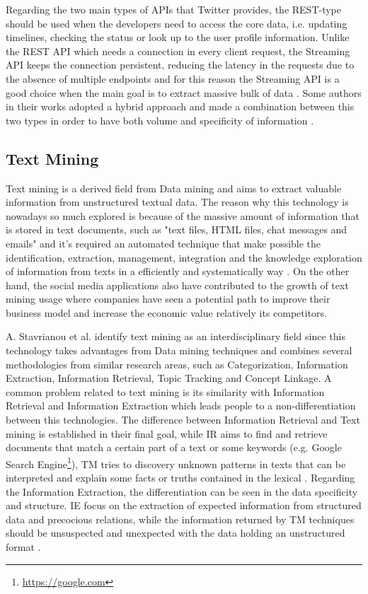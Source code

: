 Regarding the two main types of APIs that Twitter provides, the REST-type should be used when the developers need to access the core data, i.e. updating timelines, checking the status or look up to the user profile information. Unlike the REST API which needs a connection in every client request, the Streaming API keeps the connection persistent, reducing the latency in the requests due to the absence of multiple endpoints and for this reason the Streaming API is a good choice when the main goal is to extract massive bulk of data \cite{kn:Sriram2010}. Some authors in their works adopted a hybrid approach and made a combination between this two types in order to have both volume and specificity of information \cite{kn:Musto2015,kn:Abel2012}.

\subsection{Text Mining}
Text mining is a derived field from Data mining and aims to extract valuable information from unstructured textual data\cite{kn:He2013}. The reason why this technology is nowadays so much explored is because of the massive amount of information that is stored in text documents, such as "text files, HTML files, chat messages and emails" and it's required an automated technique that make possible the identification, extraction, management, integration and the knowledge exploration of information from texts in a efficiently and systematically way \cite{kn:He2013}. On the other hand, the social media applications also have contributed to the growth of text mining usage where companies have seen a potential path to improve their business model and increase the economic value relatively its competitors.

A. Stavrianou et al. \cite{kn:Stavrianou2007} identify text mining as an interdisciplinary field since this technology takes advantages from Data mining techniques and combines several methodologies from similar research areas, such as Categorization, Information Extraction, Information Retrieval, Topic Tracking and Concept Linkage. A common problem related to text mining is its similarity with Information Retrieval and Information Extraction which leads people to a non-differentiation between this technologies. The difference between Information Retrieval and Text mining is established in their final goal, while IR aims to find and retrieve documents that match a certain part of a text or some keywords (e.g. Google Search Engine\footnote{\url{https://google.com}}), TM tries to discovery unknown patterns in texts that can be interpreted and explain some facts or truths contained in the lexical \cite{kn:Stavrianou2007,kn:He2013,kn:Hotho2005}. Regarding the Information Extraction, the differentiation can be seen in the data specificity and structure. IE focus on the extraction of expected information from structured data and precocious relations, while the information returned by TM techniques should be unsuspected and unexpected with the data holding an unstructured format \cite{kn:Stavrianou2007}.

